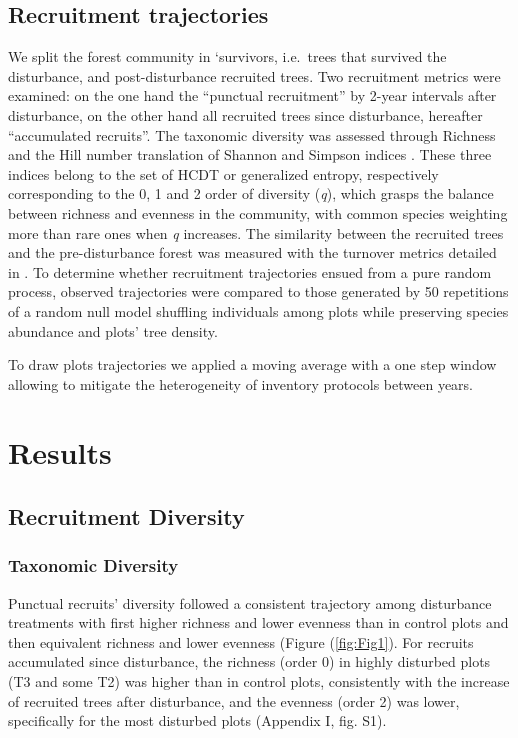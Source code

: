 \documentclass[fleqn,10pt]{ArtEcoFoG} %
\begin{document}
\subsection{Recruitment trajectories}\label{recruitment-trajectories}

We split the forest community in `survivors, i.e.~trees that survived
the disturbance, and post-disturbance recruited trees. Two recruitment
metrics were examined: on the one hand the ``punctual recruitment'' by
2-year intervals after disturbance, on the other hand all recruited
trees since disturbance, hereafter ``accumulated recruits''. The
taxonomic diversity was assessed through Richness and the Hill number
translation of Shannon and Simpson indices
\citep{Hill1973, chao2015estimating, Marcon2015b}. These three indices
belong to the set of HCDT or generalized entropy, respectively
corresponding to the 0, 1 and 2 order of diversity (\emph{q}), which
grasps the balance between richness and evenness in the community, with
common species weighting more than rare ones when \emph{q} increases.
The similarity between the recruited trees and the pre-disturbance
forest was measured with the turnover metrics detailed in
\citet{Podani2013a}. To determine whether recruitment trajectories
ensued from a pure random process, observed trajectories were compared
to those generated by 50 repetitions of a random null model shuffling
individuals among plots while preserving species abundance and plots'
tree density.

To draw plots trajectories we applied a moving average with a one step
window allowing to mitigate the heterogeneity of inventory protocols
between years.

\section{Results}\label{results}

\subsection{Recruitment Diversity}\label{recruitment-diversity}

\subsubsection{Taxonomic Diversity}\label{taxonomic-diversity}

Punctual recruits' diversity followed a consistent trajectory among
disturbance treatments with first higher richness and lower evenness
than in control plots and then equivalent richness and lower evenness
(Figure (\ref{fig:Fig1}). For recruits accumulated since disturbance,
the richness (order 0) in highly disturbed plots (T3 and some T2) was
higher than in control plots, consistently with the increase of
recruited trees after disturbance, and the evenness (order 2) was lower,
specifically for the most disturbed plots (Appendix I, fig. S1).
\end{document}
